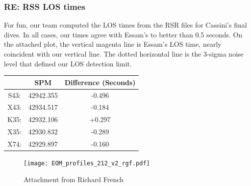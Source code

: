 \documentclass[crop=false,class=book]{standalone}
\begin{document}
\subsubsection{\footnotesize RE: RSS LOS times}
For fun, our team computed the LOS times from the RSR files for Cassini's final dives. In all cases, our times agree with Essam's to better than 0.5 seconds. On the attached plot, the vertical magenta line is Essam's LOS time, nearly coincident with our vertical line. The dotted horizontal line is the 3-sigma noise level that defined our LOS detection limit.
\begin{table}[H]
    \centering
    \begin{tabular}{c c c} 
        \hline
        & SPM      & Difference (Seconds)    \\ 
        \hline
        S43: & 42942.355 & -0.496    \\
        X43: & 42934.517 & -0.184    \\
        K35: & 42932.106 & +0.297    \\
        X35: & 42930.832 & -0.289    \\
        X74: & 42929.897 & -0.160    \\
        \hline
    \end{tabular}
\end{table}
\begin{figure}[H]
    \centering
    \texttt{[image: EOM\_profiles\_212\_v2\_rgf.pdf]}
    \caption{Attachment from Richard French}
\end{figure}
\end{document}
